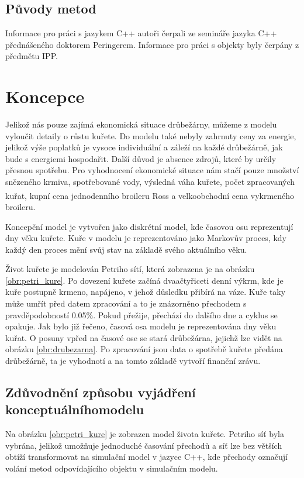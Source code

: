 \documentclass[a4paper,10pt]{article}
\begin{document}
\subsection{Původy metod}\label{puvod}
Informace pro práci s jazykem C++ autoři čerpali ze semináře jazyka C++\cite{cpp}
přednášeného doktorem Peringerem. Informace pro práci s objekty byly čerpány
z předmětu IPP\cite{ipp}.





\section{Koncepce}\label{koncepce}
Jelikož nás pouze zajímá ekonomická situace drůbežárny, můžeme z modelu vyloučit detaily
o růstu kuřete. Do modelu také nebyly zahrnuty ceny za energie, jelikož výše poplatků
je vysoce individuální a záleží na každé drůbežárně, jak bude s energiemi hospodařit. Další důvod je 
absence zdrojů, které by určily přesnou spotřebu.
Pro vyhodnocení ekonomické situace nám stačí pouze množství snězeného krmiva,
spotřebované vody, výsledná váha kuřete, počet zpracovaných kuřat, 
kupní cena jednodenního broileru Ross\textsuperscript\textregistered
a velkoobchodní cena vykrmeného broileru.
\par
Koncepční model\cite{concept_model} je vytvořen jako diskrétní model, kde časovou osu reprezentují dny věku kuřete.
Kuře v modelu je reprezentováno jako Markovův proces\cite{markovuv_proces},
kdy každý den proces mění svůj stav na základě svého aktuálního věku.
\par
Život kuřete je modelován Petriho sítí, která zobrazena je na obrázku \ref{obr:petri_kure}.
Po dovezení kuřete začíná dvaačtyřiceti denní výkrm, kde je kuře postupně krmeno, napájeno, v jehož důsledku
přibírá na váze. Kuře taky může umřít před datem zpracování a to je znázorněno přechodem\cite{prechod} s pravděpodobností 0.05\%.
Pokud přežije, přechází do dalšího dne a cyklus se opakuje. Jak bylo již řečeno, časová osa modelu je reprezentována dny
věku kuřat. O posuny vpřed na časové ose se stará drůbežárna, jejichž lze vidět na obrázku \ref{obr:drubezarna}. 
Po zpracování jsou data o spotřebě kuřete předána drůbežárně, ta je vyhodnotí a na tomto základě vytvoří finanční zrávu.

\subsection{Zdůvodnění způsobu vyjádření konceptuálního\newline modelu}
Na obrázku \ref{obr:petri_kure} je zobrazen model života kuřete. Petriho síť byla vybrána, jelikož umožňuje
jednoduché časování přechodů a síť lze bez větších obtíží transformovat na simulační model v jazyce C++, kde přechody
označují volání metod odpovídajícího objektu v simulačním modelu.
\end{document}
